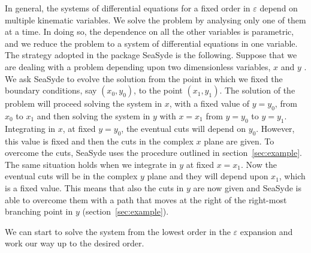 In general, the systems of differential equations for a fixed order in $\varepsilon$ depend on multiple kinematic variables. We solve the problem by analysing only one of them at a time. 
In doing so, the dependence on all the other variables is parametric, and we reduce the problem to a system of differential equations in one variable.
The strategy adopted in  the package {\sc SeaSyde} is the following. Suppose that we are dealing with a problem depending upon two dimensionless variables, $x$ and $y$ . We ask {\sc SeaSyde} to evolve the solution from the point in which we fixed the boundary conditions, say $(x_0,y_0)$, to the point $(x_1,y_1)$. The solution of the problem will proceed solving the system in $x$, with a fixed value of $y=y_0$, from $x_0$ to $x_1$ and then solving the system in $y$ with $x=x_1$ from $y=y_0$ to $y=y_1$.
Integrating in $x$, at fixed $y=y_0$, the eventual cuts will depend on $y_0$. However, this value is fixed and then the cuts in the complex $x$ plane are given. To overcome the cuts, {\sc SeaSyde} uses the procedure outlined in section~\ref{sec:example}.
The same situation holds when we integrate in $y$ at fixed $x=x_1$. Now the eventual cuts will be in the complex $y$ plane and they will depend upon $x_1$, which is a fixed value. This means that also the cuts in $y$ are now given and {\sc SeaSyde} is able to overcome them with a path that moves at the right of the right-most branching point in $y$ (section~\ref{sec:example}).










We can start to solve the system from the lowest order in the $\varepsilon$ expansion and work our way up to the desired order.



